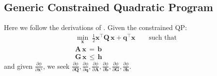 \documentclass{article}
\newcommand{\pdc}[2]{\frac{\partial #1}{\partial #2}}
\begin{document}
\subsection{Generic Constrained Quadratic Program}
Here we follow the derivations of \cite{amos2017optnet}. Given the constrained QP:
\begin{gather*}
    \min_\mathbf{x}\; \frac{1}{2}\mathbf{x}^\top \mathbf{Q}\,\mathbf{x} + \mathbf{q}^\top \mathbf{x} 
    \qquad \text{such that} \\
    \mathbf{A}\,\mathbf{x}\, =    \,\mathbf{b} \\
    \mathbf{G}\,\mathbf{x}\, \leq \,\mathbf{h}
\end{gather*}
and given $\pdc{\phi}{\mathbf{x}^\star}$, we seek $\pdc{\phi}{\mathbf{Q}}, \pdc{\phi}{\mathbf{q}}, \pdc{\phi}{\mathbf{A}}, \pdc{\phi}{\mathbf{b}}, \pdc{\phi}{\mathbf{G}}, \pdc{\phi}{\mathbf{h}}$.
\end{document}
